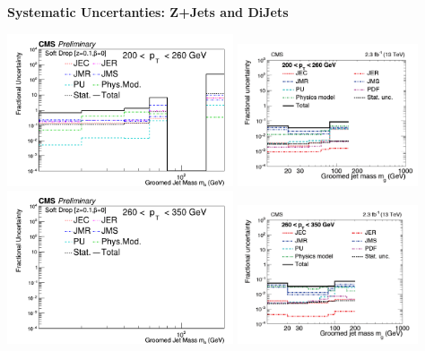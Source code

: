 \documentclass{beamer}
\begin{document}
\begin{frame}{\textbf{Systematic Uncertanties: Z+Jets and DiJets}}

\vspace{.5mm}
\includegraphics[width=0.5\textwidth]{Jun25_unfoldPlots_sdB0/AllSystematics_FractionofUnfoldedBinContent_ptbin2MC_mass_Ptbin200to260_Detbinning_Groomingis_sdB0.png}%
\includegraphics[width=0.4\textwidth]{dijet200.png}
\newline
\includegraphics[width=0.5\textwidth]{Jun25_unfoldPlots_sdB0/AllSystematics_FractionofUnfoldedBinContent_ptbin3MC_mass_Ptbin260to350_Detbinning_Groomingis_sdB0.png}%
\includegraphics[width=0.4\textwidth]{dijet260.png}


\end{frame}
\end{document}
